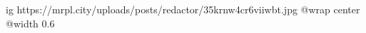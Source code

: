  
 
 
 
 

\ifcmt
  ig https://mrpl.city/uploads/posts/redactor/35krnw4cr6viiwbt.jpg
  @wrap center
  @width 0.6
\fi
